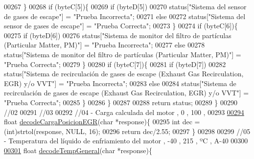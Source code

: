 \begin{DoxyCode}
00267         \}
00268         \textcolor{keywordflow}{if} (byteC[5])\{
00269             \textcolor{keywordflow}{if} (byteD[5])
00270                 status[\textcolor{stringliteral}{"Sistema del sensor de gases de escape"}] = \textcolor{stringliteral}{"Prueba Incorrecta"};
00271             \textcolor{keywordflow}{else}
00272                 status[\textcolor{stringliteral}{"Sistema del sensor de gases de escape"}] = \textcolor{stringliteral}{"Prueba Correcta"};
00273         \}
00274         \textcolor{keywordflow}{if} (byteC[6])\{
00275             \textcolor{keywordflow}{if} (byteD[6])
00276                 status[\textcolor{stringliteral}{"Sistema de monitor del filtro de partículas (Particular Matter, PM)"}] = \textcolor{stringliteral}{"Prueba
       Incorrecta"};
00277             \textcolor{keywordflow}{else}
00278                 status[\textcolor{stringliteral}{"Sistema de monitor del filtro de partículas (Particular Matter, PM)"}] = \textcolor{stringliteral}{"Prueba
       Correcta"};
00279         \}
00280         \textcolor{keywordflow}{if} (byteC[7])\{
00281             \textcolor{keywordflow}{if} (byteD[7])
00282                 status[\textcolor{stringliteral}{"Sistema de recirculación de gases de escape (Exhaust Gas Recirculation, EGR) y/o
       VVT"}] = \textcolor{stringliteral}{"Prueba Incorrecta"};
00283             \textcolor{keywordflow}{else}
00284                 status[\textcolor{stringliteral}{"Sistema de recirculación de gases de escape (Exhaust Gas Recirculation, EGR) y/o
       VVT"}] = \textcolor{stringliteral}{"Prueba Correcta"};
00285         \}
00286     \}
00287 
00288     \textcolor{keywordflow}{return} status;
00289 \}
00290 \textcolor{comment}{//02}
00291 \textcolor{comment}{//03}
00292 \textcolor{comment}{//04 - Carga calculada del motor , 0 , 100 , %
00293 
\hyperlink{decoders_8hpp_adbe68794075963c37e654d53b8a46f68}{00294} \textcolor{keywordtype}{float} \hyperlink{decoders_8cpp_adbe68794075963c37e654d53b8a46f68}{decodeCargaPosicionEGR}(\textcolor{keywordtype}{char} *response)\{
00295     \textcolor{keywordtype}{int} dec = (int)strtol(response, NULL, 16);
00296     \textcolor{keywordflow}{return} dec/2.55;
00297 \}
00298 
00299 \textcolor{comment}{//05 - Temperatura del líquido de enfriamiento del motor , -40 , 215 , ºC , A-40}
00300 
\hyperlink{decoders_8hpp_af581438645d7ff67766fa2e5eba5eaf9}{00301} \textcolor{keywordtype}{float} \hyperlink{decoders_8cpp_af581438645d7ff67766fa2e5eba5eaf9}{decodeTempGeneral}(\textcolor{keywordtype}{char} *response)\{
}
\end{DoxyCode}
